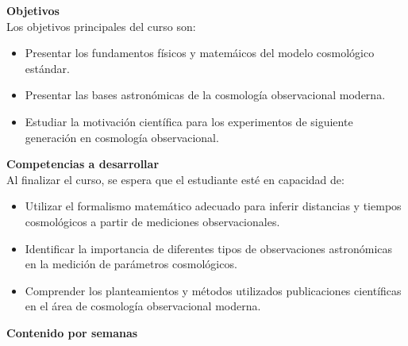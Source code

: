 \documentclass[letterpaper,10pt,onecolumn]{article}
\begin{document}
\noindent\textbf{\large {} \quad Objetivos}\\[-0.2cm]

\noindent\normalsize Los objetivos principales del curso son:

\begin{itemize}

        \item Presentar los fundamentos f\'isicos y matem\'aicos del
          modelo cosmol\'ogico est\'andar. \\[-0.6cm]
        \item Presentar las bases astron\'omicas de
          la cosmolog\'ia observacional moderna.\\[-0.6cm]
        \item Estudiar la motivaci\'on cient\'ifica para los
          experimentos de siguiente generaci\'on en cosmolog\'ia
          observacional. \\[-0.2cm]
\end{itemize}

\noindent\textbf{\large {} \quad Competencias a
  desarrollar}\\[-0.2cm] 


\noindent\normalsize Al finalizar el curso, se espera que el
estudiante est\'e en capacidad de: 

\begin{itemize}
\item Utilizar el formalismo matem\'atico adecuado para inferir distancias y
  tiempos cosmol\'ogicos a partir de mediciones observacionales. \\[-0.6cm]
\item Identificar la importancia de diferentes tipos de observaciones
  astron\'omicas en la medici\'on de par\'ametros cosmol\'ogicos.
\\[-0.6cm] 
\item Comprender los planteamientos y m\'etodos utilizados publicaciones
  cient\'ificas en el \'area de cosmolog\'ia observacional moderna. \\[-0.2cm]  
\end{itemize}

\noindent\textbf{\large {} \quad Contenido por
  semanas}\\[-0.2cm] 
\end{document}
